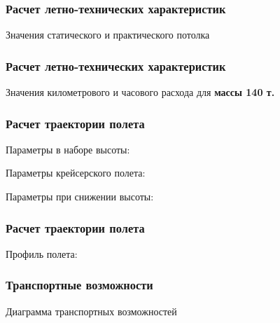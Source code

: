 \documentclass{beamer}
\begin{document}
\begin{frame}[t]
    \frametitle{Расчет летно-технических характеристик}
    \begin{center}
        Значения статического и практического потолка
        \resizebox{.70\linewidth}{!}{}
    \end{center}
\end{frame}
\begin{frame}[t]
    \frametitle{Расчет летно-технических характеристик}
    \begin{center}
        Значения километрового и часового расхода для \textbf{массы 140 т.}
        \resizebox{.70\linewidth}{!}{}
    \end{center}
\end{frame}
\begin{frame}[t]
    \frametitle{Расчет траектории полета}

    \begin{center}
        Параметры в наборе высоты:

        
        \vfill

        Параметры крейсерского полета:

        
        \vfill
        Параметры  при снижении высоты:

        
    \end{center}
\end{frame}

\begin{frame}[t]
    \frametitle{Расчет траектории полета}
    \begin{center}
        Профиль полета:

        \resizebox{.70\linewidth}{!}{}
    \end{center}
\end{frame}

\begin{frame}[t]
    \frametitle{Транспортные возможности}
    \begin{center}
        Диаграмма транспортных возможностей

        \resizebox{.70\linewidth}{!}{}
    \end{center}
\end{frame}
\end{document}
